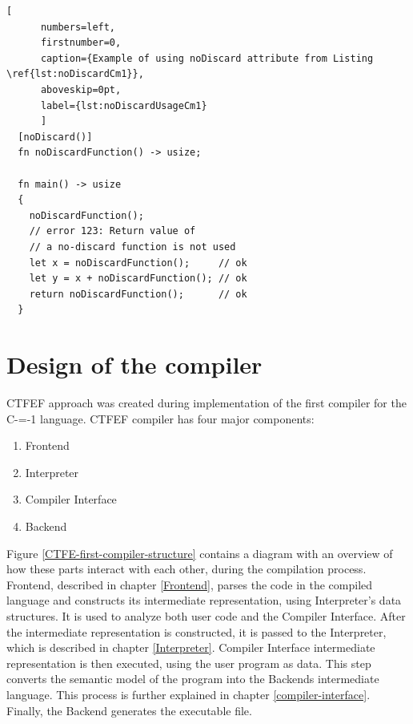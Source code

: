 \begin{minipage}{\linewidth}

	\begin{lstlisting}[
	  numbers=left,
	  firstnumber=0,
	  caption={Example of using noDiscard attribute from Listing \ref{lst:noDiscardCm1}},
	  aboveskip=0pt,
	  label={lst:noDiscardUsageCm1}
	  ]
  [noDiscard()]
  fn noDiscardFunction() -> usize;

  fn main() -> usize
  {
	noDiscardFunction();
	// error 123: Return value of
	// a no-discard function is not used
	let x = noDiscardFunction();     // ok
	let y = x + noDiscardFunction(); // ok
	return noDiscardFunction();      // ok
  }
  \end{lstlisting}
\end{minipage}

\section{Design of the compiler}
\label{compiler-design}

CTFEF approach was created during implementation of the first compiler for the C-=-1 language\cite{grabski2022compilation}.
CTFEF compiler has four major components:
\begin{enumerate}
	\item Frontend
	\item Interpreter
	\item Compiler Interface
	\item Backend
\end{enumerate}

Figure \ref{CTFE-first-compiler-structure} contains a diagram with an overview of how these parts interact with each other, during the compilation process.
Frontend, described in chapter \ref{Frontend}, parses the code in the compiled language and constructs its intermediate representation, using Interpreter's data structures.
It is used to analyze both user code and the Compiler Interface.
After the intermediate representation is constructed, it is passed to the Interpreter, which is described in chapter \ref{Interpreter}.
Compiler Interface intermediate representation is then executed, using the user program as data.
This step converts the semantic model of the program into the Backends intermediate language.
This process is further explained in chapter \ref{compiler-interface}.
Finally, the Backend generates the executable file.

